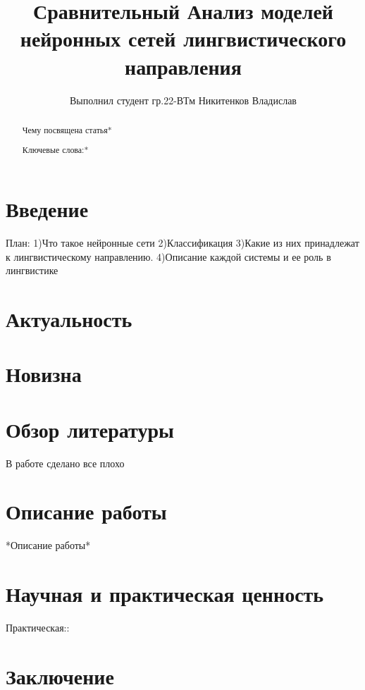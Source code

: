 \documentclass{article}
\title{Сравнительный Анализ моделей нейронных сетей лингвистического направления}
\author{Выполнил студент гр.22-ВТм Никитенков Владислав}
\begin{document}
\maketitle

\begin{abstract}
Чему посвящена статья*

Ключевые слова:*
\end{abstract}

\section{Введение}
План:
1)Что такое нейронные сети
2)Классификация
3)Какие из них принадлежат к лингвистическому направлению.
4)Описание каждой системы и ее роль в лингвистике
\section{Актуальность}
\section{Новизна}
\section{Обзор литературы}
В работе \cite{greenwade93} сделано все плохо
\section{Описание работы}
*Описание работы*
\section{Научная и практическая ценность}
Практическая::
\section{Заключение}
\end{document}
